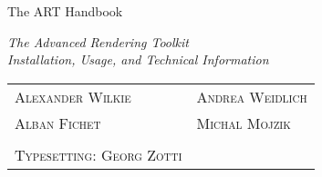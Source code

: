 
\thispagestyle{empty}

{\Huge The ART Handbook}\\
\vspace{1.5cm}

\emph{The Advanced Rendering Toolkit}\\
\emph{Installation, Usage, and Technical Information}\\

\vspace{1.5cm}

\vfill

\vspace{10cm}
{\centering
\begin{tabular}{>{\scshape }l>{\scshape }l}
Alexander Wilkie & Andrea Weidlich \\Alban Fichet & Michal Mojzik \\
 \\
Typesetting: Georg Zotti        \\
\end{tabular}
\vfill
}
